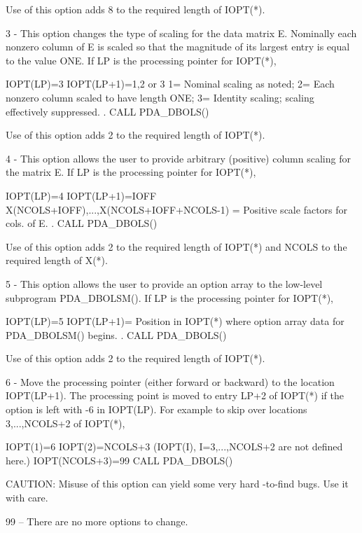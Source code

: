 \documentclass[11pt,twoside,nolof]{starlink}
\begin{document}
\begin{terminalv}
     Use of this option adds 8 to the required length of IOPT(*).

   3
   -
     This option changes the type of scaling for the data matrix E.
     Nominally each nonzero column of E is scaled so that the
     magnitude of its largest entry is equal to the value ONE. If LP
     is the processing pointer for IOPT(*),

        IOPT(LP)=3
        IOPT(LP+1)=1,2 or 3
            1= Nominal scaling as noted;
            2= Each nonzero column scaled to have length ONE;
            3= Identity scaling; scaling effectively suppressed.
         .
        CALL PDA_DBOLS()

     Use of this option adds 2 to the required length of IOPT(*).

   4
   -
     This option allows the user to provide arbitrary (positive)
     column scaling for the matrix E. If LP is the processing pointer
     for IOPT(*),

        IOPT(LP)=4
        IOPT(LP+1)=IOFF
        X(NCOLS+IOFF),...,X(NCOLS+IOFF+NCOLS-1)
        = Positive scale factors for cols. of E.
         .
        CALL PDA_DBOLS()

     Use of this option adds 2 to the required length of IOPT(*) and
     NCOLS to the required length of X(*).

   5
   -
     This option allows the user to provide an option array to the
     low-level subprogram PDA_DBOLSM(). If LP is the processing pointer
     for IOPT(*),

        IOPT(LP)=5
        IOPT(LP+1)= Position in IOPT(*) where option array
                    data for PDA_DBOLSM() begins.
         .
        CALL PDA_DBOLS()

     Use of this option adds 2 to the required length of IOPT(*).

   6
   -
     Move the processing pointer (either forward or backward) to the
     location IOPT(LP+1). The processing point is moved to entry
     LP+2 of IOPT(*) if the option is left with -6 in IOPT(LP).  For
     example to skip over locations 3,...,NCOLS+2 of IOPT(*),

       IOPT(1)=6
       IOPT(2)=NCOLS+3
       (IOPT(I), I=3,...,NCOLS+2 are not defined here.)
       IOPT(NCOLS+3)=99
       CALL PDA_DBOLS()

     CAUTION: Misuse of this option can yield some very hard
     -to-find bugs.  Use it with care.

   99
   --
     There are no more options to change.


\end{terminalv}
\end{document}

